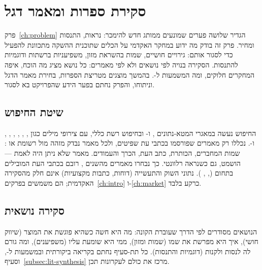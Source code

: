 \chapter{סקירת ספרות ומאמר דגל}
\label{ch:literature}

פרק~\ref{ch:problem} הגדיר שלושה פערים שמונעים ממותג חדש להימכר: נראות, התנסות
ומחיר. פרק זה בודק מה ידוע במחקר האקדמי על הכלים שתוכנית ההשקה מתכוונת להפעיל
כדי לסגור אותם: גירויים חושיים, שמות בהשראת מזון, משפיעניות ברשתות ודוגמיות
להתנסות. הסקירה בנויה לפי נושאים ולא לפי מאמרים: כל נושא מציג מה הוכח, איפה
המחקרים חלוקים, ומה המשמעות ל-. בהמשך מוצגים מטריצת הספרות, בחירת
מאמר הדגל וניתוחו, והפרק נחתם בפער הידע שהפרויקט בא לסגור.

\section{שיטת החיפוש}
\label{sec:lit-search}

החיפוש נעשה במאגרי המטא-נתונים ,  ו-
ובחיפוש רשת כללי, עם צירופי מילים כגון , ,
, , , ,
 ו-. נכללו רק מאמרים שפורסמו בכתבי עת
שפיטים, ולכל מאמר נבדק מזהה  מול רשומת  או :
שמות המחברים, הכותרת, כתב העת, הכרך והעמודים. מאמר שלא ניתן היה לאמת ---
הושמט, גם כשנראה רלוונטי. כך נבחרו  מאמרים מהשנים ,
רובם בכתבי העת המובילים בתחום (, , ). נתוני השוק והתעשייה (דוחות, כתבות
מקצועיות) אינם חלק מהסקירה האקדמית; הם משמשים בפרקים~\ref{ch:intro}
ו-\ref{ch:market} כרקע בלבד.

\section{סקירה נושאית}
\label{sec:lit-review}

הנושאים מסודרים לפי הדרך שעוברת הקונה: מה היא חשה כשהיא פוגשת את המוצר
(שיווק חושי), איך היא מפרשת את שמו (שמות ומזון), ממי היא שומעת עליו
(משפיענים), ומה גורם לה לנסות ולקנות (דוגמיות והתנסות). כל תת-סעיף נחתם
בקריאה ביקורתית ובמשמעות ל-, וסעיף~\ref{subsec:lit-synthesis} מרכז
את כולם לעקרונות תכן.


